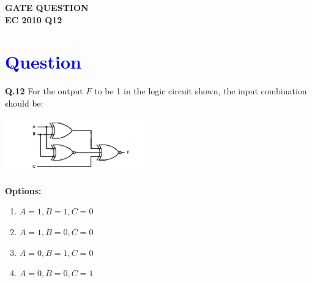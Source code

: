 \documentclass[a4paper,12pt]{article}
\begin{document}
\pagestyle{empty} %

\thispagestyle{fancy} %
\fancyhf{} %
\renewcommand{\headrulewidth}{0pt} %



\vspace{1.5cm}
\begin{center}
    {\LARGE \textbf{\textcolor{darkskyblue}{GATE QUESTION\\EC 2010 Q12}}}
\end{center}

\vspace{0.5cm}
\section*{\textcolor{blue}{Question}}

\noindent\textbf{Q.12} For the output \( F \) to be 1 in the logic circuit shown, the input combination should be:

\vspace{1em}

\begin{center}
    \includegraphics[width=0.45\textwidth]{fpga.png}
\end{center}

\vspace{1em}

\noindent\textbf{Options:}
\begin{enumerate}[label=(\Alph*)]
    \item \( A = 1, B = 1, C = 0 \)
    \item \( A = 1, B = 0, C = 0 \)
    \item \( A = 0, B = 1, C = 0 \)
    \item \( A = 0, B = 0, C = 1 \)
\end{enumerate}
\end{document}
